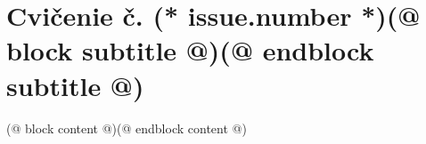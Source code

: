 \documentclass[12pt, twoside]{dgs}
\begin{document}
    \pagestyle{handout}
    \setcounter{section}{(* issue.number - 1 *)}
    \section{Cvičenie č. (* issue.number *)(@ block subtitle @)(@ endblock subtitle @)}
    (@ block content @)(@ endblock content @)
\end{document}
